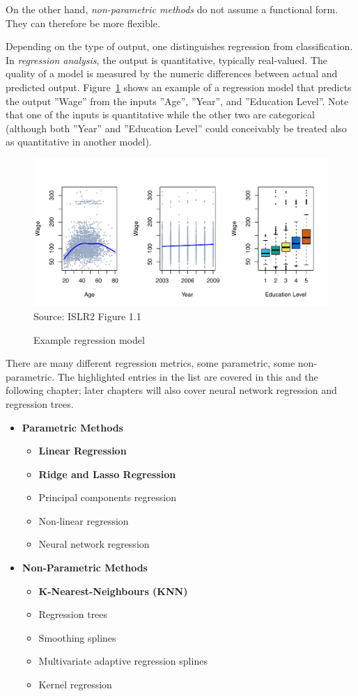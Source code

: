 On the other hand, \emph{non-parametric methods} do not assume a functional form. They can therefore be more flexible. 

Depending on the type of output, one distinguishes regression from classification. In \emph{regression analysis}, the output is quantitative, typically real-valued. The quality of a model is measured by the numeric differences between actual and predicted output. Figure~\ref{fig:regression_chap11} shows an example of a regression model that predicts the output ''Wage'' from the inputs ''Age'', ''Year'', and ''Education Level''. Note that one of the inputs is quantitative while the other two are categorical (although both ''Year'' and ''Education Level'' could conceivably be treated also as quantitative in another model).

\begin{figure}
\centering
\includegraphics[width=.85\textwidth]{Figures_Chapters_1-6/Chapter1/1_1.pdf} \\
\scriptsize Source: ISLR2 Figure 1.1
\caption{Example regression model}
\label{fig:regression_chap11}
\end{figure}

There are many different regression metrics, some parametric, some non-parametric. The highlighted entries in the list are covered in this and the following chapter; later chapters will also cover neural network regression and regression trees. 

\begin{itemize}
\item \textbf{Parametric Methods}
\begin{itemize}
   \item \textbf{Linear Regression}
   \item \textbf{Ridge and Lasso Regression}
   \item Principal components regression
   \item Non-linear regression
   \item Neural network regression
\end{itemize}
\item \textbf{Non-Parametric Methods}
\begin{itemize}
  \item \textbf{K-Nearest-Neighbours (KNN)}
  \item Regression trees
  \item Smoothing splines
  \item Multivariate adaptive regression splines
  \item Kernel regression
\end{itemize}
\end{itemize}

